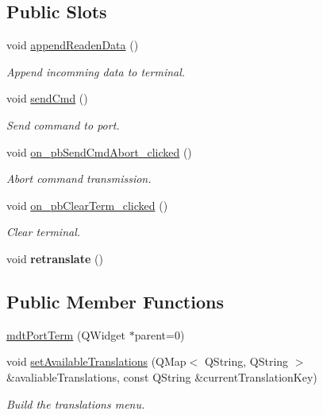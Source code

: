 \subsection*{Public Slots}
\begin{DoxyCompactItemize}
\item 
void \hyperlink{classmdt_port_term_a5bd2b5e6c19c2c4b612f84763bb9ed6f}{appendReadenData} ()
\begin{DoxyCompactList}\small\item\em Append incomming data to terminal. \end{DoxyCompactList}\item 
void \hyperlink{classmdt_port_term_a7ec568c44f862fe7aee83f1a271ac6bb}{sendCmd} ()
\begin{DoxyCompactList}\small\item\em Send command to port. \end{DoxyCompactList}\item 
void \hyperlink{classmdt_port_term_a1b232e686b401d7103eb1c682be330a9}{on\_\-pbSendCmdAbort\_\-clicked} ()
\begin{DoxyCompactList}\small\item\em Abort command transmission. \end{DoxyCompactList}\item 
\hypertarget{classmdt_port_term_abb3fc55837782dbea240b069a48b18ce}{
void \hyperlink{classmdt_port_term_abb3fc55837782dbea240b069a48b18ce}{on\_\-pbClearTerm\_\-clicked} ()}
\label{classmdt_port_term_abb3fc55837782dbea240b069a48b18ce}

\begin{DoxyCompactList}\small\item\em Clear terminal. \end{DoxyCompactList}\item 
\hypertarget{classmdt_port_term_a542e20f789bcdc5f2ddf2b6e698ceea2}{
void {\bfseries retranslate} ()}
\label{classmdt_port_term_a542e20f789bcdc5f2ddf2b6e698ceea2}

\end{DoxyCompactItemize}
\subsection*{Public Member Functions}
\begin{DoxyCompactItemize}
\item 
\hyperlink{classmdt_port_term_a5e93890f53b5112be80983779a3ab233}{mdtPortTerm} (QWidget $\ast$parent=0)
\item 
\hypertarget{classmdt_port_term_a9e2987c96c85189ce118aab7af77fb71}{
void \hyperlink{classmdt_port_term_a9e2987c96c85189ce118aab7af77fb71}{setAvailableTranslations} (QMap$<$ QString, QString $>$ \&avaliableTranslations, const QString \&currentTranslationKey)}
\label{classmdt_port_term_a9e2987c96c85189ce118aab7af77fb71}

\begin{DoxyCompactList}\small\item\em Build the translations menu. \end{DoxyCompactList}\end{DoxyCompactItemize}


